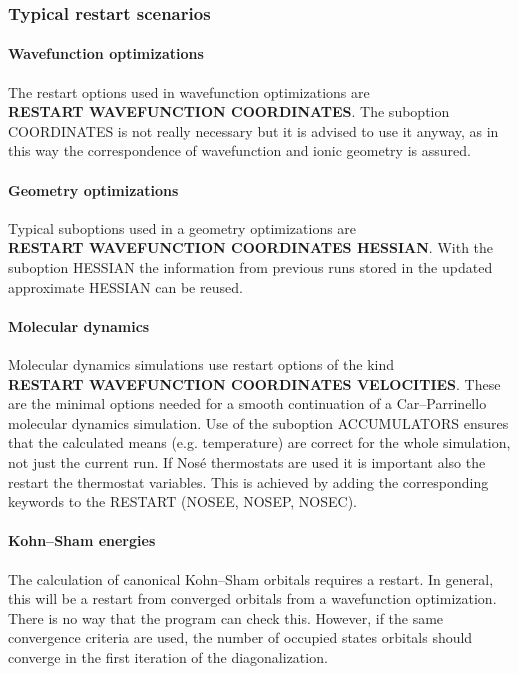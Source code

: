 \documentclass[twoside,10pt,titlepage,a4paper]{article}
\begin{document}
\subsubsection{Typical restart scenarios}

\paragraph{Wavefunction optimizations}

  The restart options used in wavefunction optimizations are \\ {\bf RESTART
WAVEFUNCTION COORDINATES}. The suboption COORDINATES is not really necessary
but it is advised to use it anyway, as in this way the correspondence of
wavefunction and ionic geometry is assured.

\paragraph{Geometry optimizations}

  Typical suboptions used in a geometry optimizations are \\ {\bf RESTART
WAVEFUNCTION COORDINATES HESSIAN}. With the suboption HESSIAN the information
from previous runs stored in the updated approximate HESSIAN can be reused.

\paragraph{Molecular dynamics}

  Molecular dynamics simulations use restart options of the kind \\ {\bf
RESTART WAVEFUNCTION COORDINATES VELOCITIES}. These are the minimal options
needed for a smooth continuation of a Car--Parrinello molecular dynamics
simulation. Use of the suboption ACCUMULATORS ensures that the calculated means
(e.g. temperature) are correct for the whole simulation, not just the current
run. If Nos\'e thermostats are used it is important also the restart the
thermostat variables. This is achieved by adding the corresponding keywords to
the RESTART (NOSEE, NOSEP, NOSEC).

\paragraph{Kohn--Sham energies}
  The calculation of canonical Kohn--Sham orbitals requires a restart. In
general, this will be a restart from converged orbitals from a wavefunction
optimization. There is no way that the program can check this. However, if the
same convergence criteria are used, the number of occupied states orbitals
should converge in the first iteration of the diagonalization.
\end{document}

